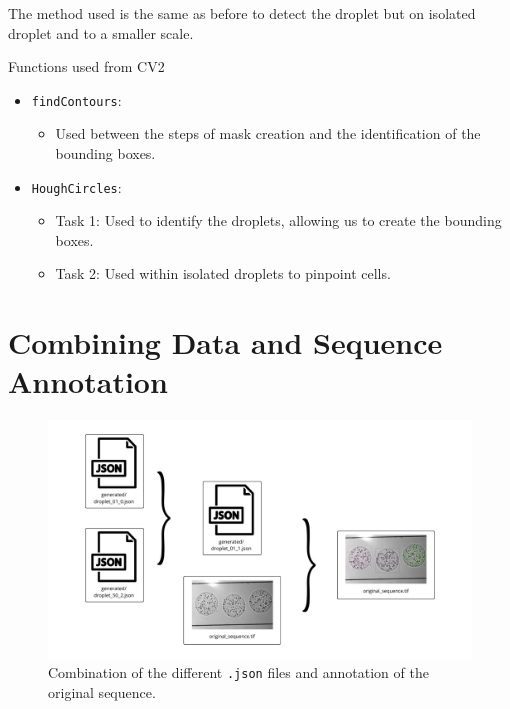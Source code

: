 \documentclass[12pt]{beamer}
\begin{document}
\begin{frame}[t]
\begin{multicols}{3}
    The method used is the same as before to detect the droplet but on isolated droplet and to a smaller scale.

\vspace{0.25cm}

\begin{alertblock}{Functions used from CV2 \cite{cv2}}
\begin{itemize}
\item \texttt{findContours}:
\begin{itemize}
\item Used between the steps of mask creation and the identification of the bounding boxes.
\end{itemize}
\item \texttt{HoughCircles}:
\begin{itemize}
    \item Task 1: Used to identify the droplets, allowing us to create the bounding boxes.
    \item Task 2: Used within isolated droplets to pinpoint cells.
    \end{itemize}
\end{itemize}    
    
    
\end{alertblock}

\section{Combining Data and Sequence Annotation}
    \begin{figure}[H]
        \centering
        \includegraphics[width=.9\linewidth]{figs/section4.png}
        \caption{Combination of the different \texttt{.json} files and annotation of the original sequence.}
        \label{fig:annotate}
    \end{figure}
\columnbreak 

\end{multicols}
\end{frame}
\end{document}
